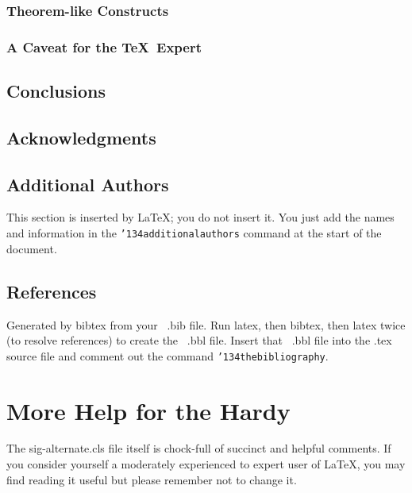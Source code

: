 \documentclass[sigconf]{nimepaper}
\begin{document}
\subsubsection{Theorem-like Constructs}
\subsubsection*{A Caveat for the \TeX\ Expert}
\subsection{Conclusions}
\subsection{Acknowledgments}
\subsection{Additional Authors}
This section is inserted by \LaTeX; you do not insert it.
You just add the names and information in the
\texttt{{\char'134}additionalauthors} command at the start
of the document.
\subsection{References}
Generated by bibtex from your ~.bib file.  Run latex,
then bibtex, then latex twice (to resolve references)
to create the ~.bbl file.  Insert that ~.bbl file into
the .tex source file and comment out
the command \texttt{{\char'134}thebibliography}.

\section{More Help for the Hardy}
The sig-alternate.cls file itself is chock-full of succinct
and helpful comments.  If you consider yourself a moderately
experienced to expert user of \LaTeX, you may find reading
it useful but please remember not to change it.


\end{document}
